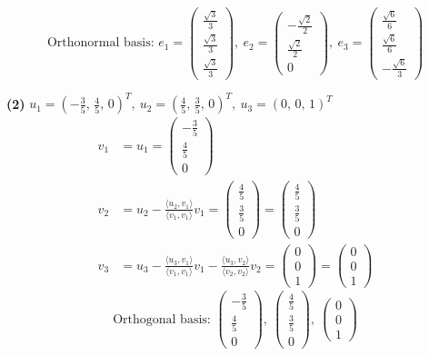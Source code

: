 \[ \text{Orthonormal basis: }e_1=\begin{pmatrix}\frac{\sqrt{3}}{3} \\ \frac{\sqrt{3}}{3} \\ \frac{\sqrt{3}}{3}\end{pmatrix},\ e_2=\begin{pmatrix}- \frac{\sqrt{2}}{2} \\ \frac{\sqrt{2}}{2} \\ 0\end{pmatrix},\ e_3=\begin{pmatrix}\frac{\sqrt{6}}{6} \\ \frac{\sqrt{6}}{6} \\ - \frac{\sqrt{6}}{3}\end{pmatrix} \]

\noindent\textbf{(2)} $u_1=(- \frac{3}{5},\,\frac{4}{5},\,0)^T,\ u_2=(\frac{4}{5},\,\frac{3}{5},\,0)^T,\ u_3=(0,\,0,\,1)^T$
\begin{align*}
v_1&=u_1=\begin{pmatrix}- \frac{3}{5} \\ \frac{4}{5} \\ 0\end{pmatrix} \\
v_2&=u_2-\frac{\langle u_2,v_1\rangle}{\langle v_1,v_1\rangle}v_1=\begin{pmatrix}\frac{4}{5} \\ \frac{3}{5} \\ 0\end{pmatrix}=\begin{pmatrix}\frac{4}{5} \\ \frac{3}{5} \\ 0\end{pmatrix} \\
v_3&=u_3-\frac{\langle u_3,v_1\rangle}{\langle v_1,v_1\rangle}v_1-\frac{\langle u_3,v_2\rangle}{\langle v_2,v_2\rangle}v_2=\begin{pmatrix}0 \\ 0 \\ 1\end{pmatrix}=\begin{pmatrix}0 \\ 0 \\ 1\end{pmatrix}
\end{align*}
\[ \text{Orthogonal basis: }\begin{pmatrix}- \frac{3}{5} \\ \frac{4}{5} \\ 0\end{pmatrix},\ \begin{pmatrix}\frac{4}{5} \\ \frac{3}{5} \\ 0\end{pmatrix},\ \begin{pmatrix}0 \\ 0 \\ 1\end{pmatrix} \]
